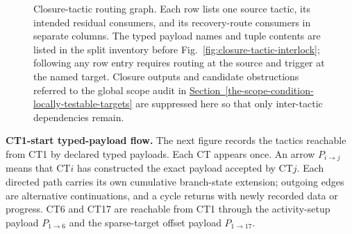 \documentclass[
  11pt,
]{article}
\theoremstyle{definition}
\newcommand{\secref}[1]{\hyperref[#1]{Section~\ref*{#1}}}
\begin{document}
\begin{figure}[p]
{%
}
\caption[Closure-tactic routing graph]{Closure-tactic routing graph.  Each row lists one source tactic, its intended residual consumers, and its recovery-route consumers in separate columns.  The typed payload names and tuple contents are listed in the split inventory before Fig.~\ref{fig:closure-tactic-interlock}; following any row entry requires routing at the source and trigger at the named target.  Closure outputs and candidate obstructions referred to the global scope audit in \secref{the-scope-condition-locally-testable-targets} are suppressed here so that only inter-tactic dependencies remain.}
\label{fig:closure-tactic-routing-graph}
\end{figure}

\noindent\textbf{CT1-start typed-payload flow.}
The next figure records the tactics reachable from CT1 by declared
typed payloads.  Each CT appears once.  An arrow \(P_{i\to j}\) means
that CT\(i\) has constructed the exact payload accepted by CT\(j\).
Each directed path carries its own cumulative branch-state extension;
outgoing edges are alternative continuations, and a cycle returns with
newly recorded data or progress. CT6 and CT17 are reachable from
CT1 through the activity-setup payload \(P_{1\to6}\) and the sparse-target
offset payload \(P_{1\to17}\).
\end{document}
